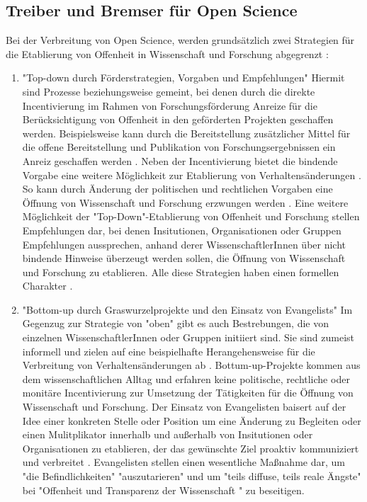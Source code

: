 \subsection{Treiber und Bremser für Open Science} 
Bei der Verbreitung von Open Science, werden grundsätzlich zwei Strategien für die Etablierung von Offenheit in Wissenschaft und Forschung abgegrenzt \cite{schulze_2013_open}: 
\begin{enumerate}
\item "Top-down durch Förderstrategien, Vorgaben und Empfehlungen"
Hiermit sind Prozesse beziehungsweise gemeint, bei denen durch die direkte Incentivierung im Rahmen von Forschungsförderung Anreize für die Berücksichtigung von Offenheit in den geförderten Projekten geschaffen werden. Beispielsweise kann durch die Bereitstellung zusätzlicher Mittel für die offene Bereitstellung und Publikation von Forschungsergebnissen ein Anreiz geschaffen werden  \cite{suchen}. Neben der Incentivierung bietet die bindende Vorgabe eine weitere Möglichkeit zur Etablierung von Verhaltensänderungen \cite{suchen}. So kann durch Änderung der politischen und rechtlichen Vorgaben eine Öffnung von Wissenschaft und Forschung erzwungen werden \cite{suchen}. Eine weitere Möglichkeit der "Top-Down"-Etablierung von Offenheit und Forschung stellen Empfehlungen dar, bei denen Insitutionen, Organisationen oder Gruppen Empfehlungen aussprechen, anhand derer WissenschaftlerInnen über nicht bindende Hinweise überzeugt werden sollen, die Öffnung von Wissenschaft und Forschung zu etablieren. Alle diese Strategien haben einen formellen Charakter \cite{suchen}.
\item "Bottom-up durch Graswurzelprojekte und den Einsatz von Evangelists"
Im Gegenzug zur Strategie von "oben" gibt es auch Bestrebungen, die von einzelnen WissenschaftlerInnen oder Gruppen initiiert sind. Sie sind zumeist informell und zielen auf eine beispielhafte Herangehensweise für die Verbreitung von Verhaltensänderungen ab \cite{suchen}. Bottum-up-Projekte kommen aus dem wissenschaftlichen Alltag und erfahren keine politische, rechtliche oder monitäre Incentivierung zur Umsetzung der Tätigkeiten für die Öffnung von Wissenschaft und Forschung. Der Einsatz von Evangelisten baisert auf der Idee einer konkreten Stelle oder Position um eine Änderung zu Begleiten \cite{suchen} oder einen Mulitplikator innerhalb und außerhalb von Insitutionen oder Organisationen zu etablieren, der das gewünschte Ziel proaktiv kommuniziert und verbreitet \cite{suchen}. Evangelisten stellen einen wesentliche Maßnahme dar, um "die Befindlichkeiten" "auszutarieren" und um "teils diffuse, teils reale Ängste" bei "Offenheit und Transparenz der Wissenschaft "\cite{schulze_2013_open} zu beseitigen.
\end{enumerate} 

